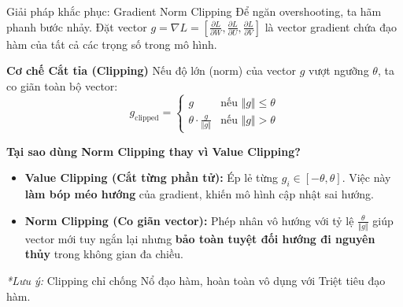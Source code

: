 \begin{frame}{Giải pháp khắc phục: Gradient Norm Clipping}
\footnotesize
Để ngăn overshooting, ta hãm phanh bước nhảy. Đặt vector $g = \nabla L = \left[ \frac{\partial L}{\partial W}, \frac{\partial L}{\partial U}, \frac{\partial L}{\partial V} \right]$ là vector gradient chứa đạo hàm của tất cả các trọng số trong mô hình.

\vspace{0.05cm}
\begin{exampleblock}{\textbf{Cơ chế Cắt tỉa (Clipping)}}
Nếu độ lớn (norm) của vector $g$ vượt ngưỡng $\theta$, ta co giãn toàn bộ vector:
\[ g_{\text{clipped}} = \begin{cases} 
g & \text{nếu } \Vert g \Vert \le \theta \\
\theta \cdot \frac{g}{\Vert g \Vert} & \text{nếu } \Vert g \Vert > \theta 
\end{cases} \]
\end{exampleblock}

\vspace{0.05cm}
\begin{alertblock}{\textbf{Tại sao dùng Norm Clipping thay vì Value Clipping?}}
\begin{itemize}
    \item \textbf{Value Clipping (Cắt từng phần tử):} Ép lẻ từng $g_i \in [-\theta, \theta]$. Việc này \textbf{làm bóp méo hướng} của gradient, khiến mô hình cập nhật sai hướng.
    \item \textbf{Norm Clipping (Co giãn vector):} Phép nhân vô hướng với tỷ lệ $\frac{\theta}{\Vert g \Vert}$ giúp vector mới tuy ngắn lại nhưng \textbf{bảo toàn tuyệt đối hướng đi nguyên thủy} trong không gian đa chiều.
\end{itemize}
\end{alertblock}

\vspace{0.05cm}
\textit{\textcolor{crimsonred}{*Lưu ý:}} Clipping chỉ chống Nổ đạo hàm, hoàn toàn vô dụng với Triệt tiêu đạo hàm.
\end{frame}



